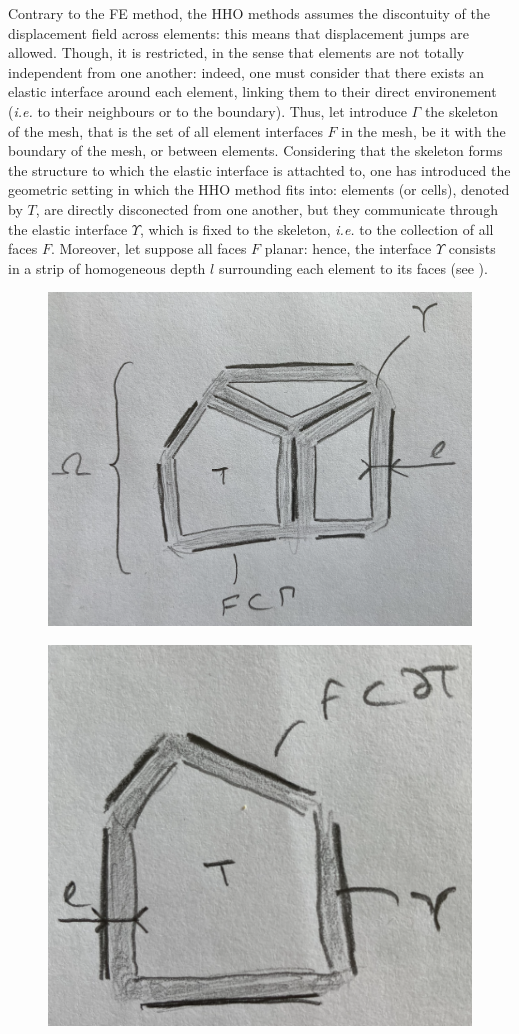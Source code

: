         Contrary to the FE method,
        the HHO methods assumes the discontuity of the displacement field across elements: this means that displacement jumps are allowed.
        Though, it is restricted, in the sense that elements are not totally independent from one another: indeed, one must consider that there exists an elastic interface around each element, linking them to their direct environement (\textit{i.e.} to their neighbours or to the boundary).
        Thus, let introduce $\Gamma$ the skeleton of the mesh, that is the set of all element interfaces $F$ in the mesh, be it with the boundary of the mesh, or between elements.
        Considering that the skeleton forms the structure to which the elastic interface is attachted to, one has introduced the geometric setting in which the HHO method fits into: elements (or cells), denoted by $T$, are directly disconected from one another, but they communicate through the elastic interface $\Upsilon$, which is fixed to the skeleton, \textit{i.e.} to the collection of all faces $F$. Moreover, let suppose all faces $F$ planar: hence, the interface $\Upsilon$ consists in a strip of homogeneous depth $l$ surrounding each element to its faces (see ).

        \begin{figure}[h]
            \begin{minipage}{.5\textwidth}
                \centering
                \includegraphics[width=5.cm]{img/fig_intro_1.png}
                \label{fig_intro_1}
            \end{minipage}%
            \begin{minipage}{.5\textwidth}
                \centering
                \includegraphics[width=5.cm]{img/fig_intro_2.png}
                \label{fig_intro_2}
            \end{minipage}%
        \end{figure}

